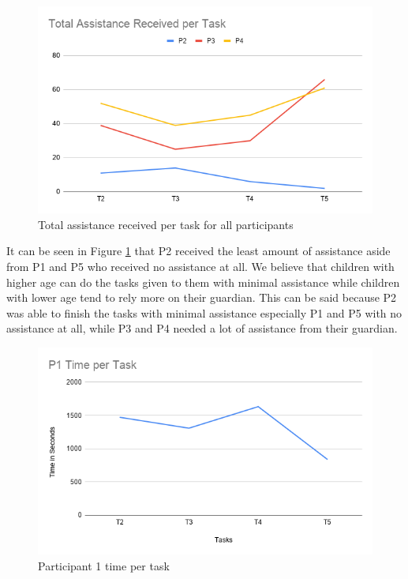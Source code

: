 \begin{figure}[H]
    \centering
    \includegraphics[width=15cm]{figures/Results/allAssistance.png}
    \caption{Total assistance received per task for all participants}
    \label{fig:allassistance}
\end{figure}

It can be seen in Figure \ref{fig:allassistance} that P2 received the least amount of assistance aside from P1 and P5 who received no assistance at all. We believe that children with higher age can do the tasks given to them with minimal assistance while children with lower age tend to rely more on their guardian. This can be said because P2 was able to finish the tasks with minimal assistance especially P1 and P5 with no assistance at all, while P3 and P4 needed a lot of assistance from their guardian. 

\begin{figure}[H]
    \centering
    \includegraphics[width=15cm]{figures/Results/P1Time.png}
    \caption{Participant 1 time per task}
    \label{fig:P1Time}
\end{figure}

